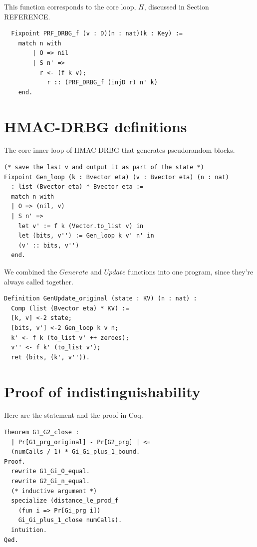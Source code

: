 \documentclass[12pt,lot, lof]{puthesis}
\begin{document}
{This function corresponds to the core loop, $H$, discussed in Section REFERENCE.

\begin{lstlisting}
  Fixpoint PRF_DRBG_f (v : D)(n : nat)(k : Key) :=
    match n with
        | O => nil
        | S n' => 
          r <- (f k v);
            r :: (PRF_DRBG_f (injD r) n' k)
    end.
\end{lstlisting}

\section{HMAC-DRBG definitions} \label{sec:hmac_drbg_definitions}

The core inner loop of HMAC-DRBG that generates pseudorandom blocks. 

\begin{lstlisting}
(* save the last v and output it as part of the state *)
Fixpoint Gen_loop (k : Bvector eta) (v : Bvector eta) (n : nat)
  : list (Bvector eta) * Bvector eta :=
  match n with
  | O => (nil, v)
  | S n' =>
    let v' := f k (Vector.to_list v) in
    let (bits, v'') := Gen_loop k v' n' in
    (v' :: bits, v'')           
  end.
\end{lstlisting}

We combined the $Generate$ and $Update$ functions into one program, since they're always called together.

\begin{lstlisting}
Definition GenUpdate_original (state : KV) (n : nat) :
  Comp (list (Bvector eta) * KV) :=
  [k, v] <-2 state;
  [bits, v'] <-2 Gen_loop k v n;
  k' <- f k (to_list v' ++ zeroes);
  v'' <- f k' (to_list v');
  ret (bits, (k', v'')).
\end{lstlisting}

\section{Proof of indistinguishability} \label{sec:proof_of_indistinguishability}

Here are the statement and the proof in Coq. 

\begin{lstlisting}
Theorem G1_G2_close :
  | Pr[G1_prg_original] - Pr[G2_prg] | <= 
  (numCalls / 1) * Gi_Gi_plus_1_bound.
Proof.
  rewrite G1_Gi_O_equal.
  rewrite G2_Gi_n_equal.
  (* inductive argument *)
  specialize (distance_le_prod_f 
  	(fun i => Pr[Gi_prg i]) 
	Gi_Gi_plus_1_close numCalls).
  intuition.
Qed.
\end{lstlisting}

}
\end{document}
